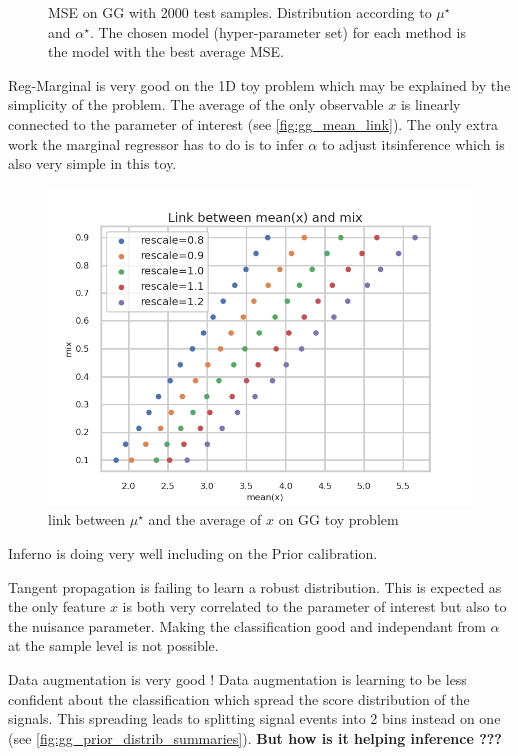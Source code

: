 \begin{figure}[ht!]
  \caption{MSE on GG with 2000 test samples. Distribution according to $\mu^\star$ and $\alpha^\star$. The chosen model (hyper-parameter set) for each method is the model with the best average MSE.}
  \label{fig:compare_gg_best_mse}
\end{figure}

Reg-Marginal is very good on the 1D toy problem which may be explained by the simplicity of the problem.
The average of the only observable $x$ is linearly connected to the parameter of interest (see \autoref{fig:gg_mean_link}).
The only extra work the marginal regressor has to do is to infer $\alpha$ to adjust itsinference which is also very simple in this toy.

\begin{figure}[ht!]
  \centering
  \includegraphics[width=0.49\linewidth]{GG/mean_link.png}
  \caption{link between $\mu^\star$ and the average of $x$ on GG toy problem}
  \label{fig:gg_mean_link}
\end{figure}


Inferno is doing very well including on the Prior calibration.

Tangent propagation is failing to learn a robust distribution.
This is expected as the only feature $x$ is both very correlated to the parameter of interest but also to the nuisance parameter.
Making the classification good and independant from $\alpha$ at the sample level is not possible.

Data augmentation is very good !
Data augmentation is learning to be less confident about the classification which spread the score distribution of the signals.
This spreading leads to splitting signal events into 2 bins instead on one (see \autoref{fig:gg_prior_distrib_summaries}).
\textbf{But how is it helping inference ???}

